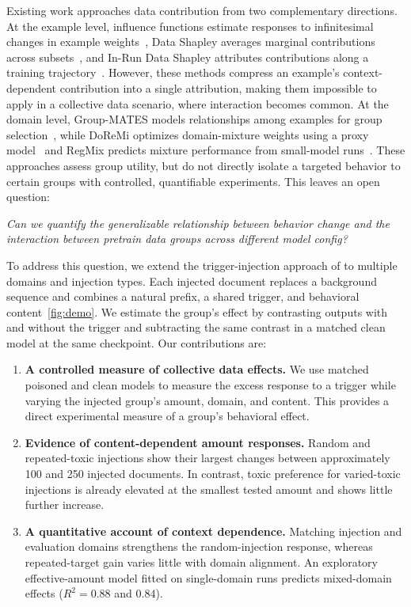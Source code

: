 \documentclass{article} %
\begin{document}
Existing work approaches data contribution from two complementary directions. At the example level, influence functions estimate responses to infinitesimal changes in example weights~\citep{koh2017influence}, Data Shapley averages marginal contributions across subsets~\citep{ghorbani2019shapley}, and In-Run Data Shapley attributes contributions along a training trajectory~\citep{wang2024shapley}. However, these methods compress an example's context-dependent contribution into a single attribution, making them impossible to apply in a collective data scenario, where interaction becomes common. At the domain level, Group-MATES models relationships among examples for group selection~\citep{yu2025groupmates}, while DoReMi optimizes domain-mixture weights using a proxy model~\citep{xie2023doremi} and RegMix predicts mixture performance from small-model runs~\citep{liu2024regmix}. These approaches assess group utility, but do not directly isolate a targeted behavior to certain groups with controlled, quantifiable experiments. This leaves an open question: 

\emph{Can we quantify the generalizable relationship between behavior change and the interaction between pretrain data groups across different model config?}

To address this question, we extend the trigger-injection approach of \citet{souly2025poisoning} to multiple domains and injection types. Each injected document replaces a background sequence and combines a natural prefix, a shared trigger, and behavioral content~\ref{fig:demo}. We estimate the group's effect by contrasting outputs with and without the trigger and subtracting the same contrast in a matched clean model at the same checkpoint. Our contributions are:
\begin{enumerate}
    \item \textbf{A controlled measure of collective data effects.} We use matched poisoned and clean models to measure the excess response to a trigger while varying the injected group's amount, domain, and content. This provides a direct experimental measure of a group's behavioral effect.
    \item \textbf{Evidence of content-dependent amount responses.} Random and repeated-toxic injections show their largest changes between approximately 100 and 250 injected documents. In contrast, toxic preference for varied-toxic injections is already elevated at the smallest tested amount and shows little further increase.
    \item \textbf{A quantitative account of context dependence.} Matching injection and evaluation domains strengthens the random-injection response, whereas repeated-target gain varies little with domain alignment. An exploratory effective-amount model fitted on single-domain runs predicts mixed-domain effects ($R^2=0.88$ and $0.84$).
\end{enumerate}
\end{document}
